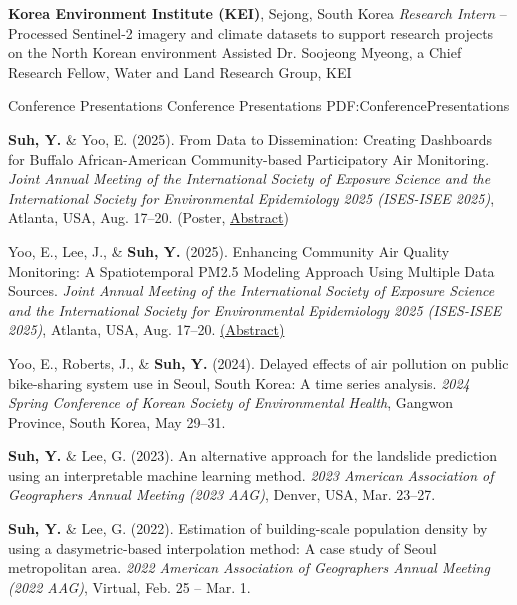 \documentclass[letterpaper,MMMyyyy,nonstopmode]{simpleresumecv}
\begin{document}
\begin{Body}
\Entry
\textbf{Korea Environment Institute (KEI)}, Sejong, South Korea
\Gap
\textit{       Research Intern}
\hfill
{} --
\Gap
\SubBulletItem
Processed Sentinel-2 imagery and climate datasets to support research projects on the North Korean environment
\Gap
\SubBulletItem
Assisted Dr. Soojeong Myeong, a Chief Research Fellow, Water and Land Research Group, KEI
\BigGap



\Section
{Conference Presentations}
{Conference Presentations}
{PDF:ConferencePresentations}

\NumberedItem{[5]}
\textbf{Suh, Y.} \& Yoo, E. (2025).
From Data to Dissemination: Creating Dashboards for Buffalo African-American Community-based Participatory Air Monitoring.
\textit{Joint Annual Meeting of the International Society of Exposure Science and the International Society for Environmental Epidemiology 2025 (ISES-ISEE 2025)}, Atlanta, USA, Aug. 17–20. \hfill (Poster, \href{https://eventclass.it/isesisee2025/scientific/external-program/session?s=P07#e2609}{Abstract})

\BigGap

\NumberedItem{[4]}
Yoo, E., Lee, J., \& \textbf{Suh, Y.} (2025).
Enhancing Community Air Quality Monitoring: A Spatiotemporal PM2.5 Modeling Approach Using Multiple Data Sources.
\textit{Joint Annual Meeting of the International Society of Exposure Science and the International Society for Environmental Epidemiology 2025 (ISES-ISEE 2025)}, Atlanta, USA, Aug. 17–20. \hfill\href{https://eventclass.it/isesisee2025/scientific/external-program/session?s=TO16#e477}{(Abstract)}

\BigGap

\NumberedItem{[3]}
Yoo, E., Roberts, J., \& \textbf{Suh, Y.} (2024).
Delayed effects of air pollution on public bike-sharing system use in Seoul, South Korea: A time series analysis.
\textit{2024 Spring Conference of Korean Society of Environmental Health}, Gangwon Province, South Korea, May 29–31.

\BigGap

\NumberedItem{[2]}
\textbf{Suh, Y.} \& Lee, G. (2023).
An alternative approach for the landslide prediction using an interpretable machine learning method.
\textit{2023 American Association of Geographers Annual Meeting (2023 AAG)}, Denver, USA, Mar. 23–27.

\BigGap

\NumberedItem{[1]}
\textbf{Suh, Y.} \& Lee, G. (2022).
Estimation of building-scale population density by using a dasymetric-based interpolation method: A case study of Seoul metropolitan area.
\textit{2022 American Association of Geographers Annual Meeting (2022 AAG)}, Virtual, Feb. 25 – Mar. 1.


\end{Body}
\end{document}
